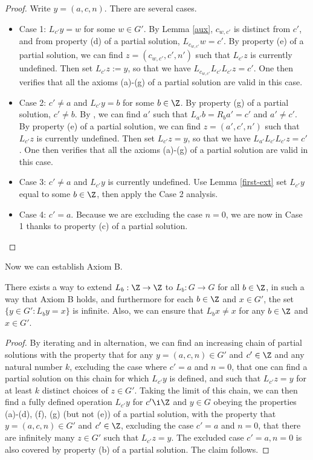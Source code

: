 \begin{proof} Write $y = (a,c,n)$. There are several cases.
  \begin{itemize}
    \item Case 1: $L_{c'} y = w$ for some $w \in G'$.  By Lemma \ref{aux}, $c_{w,c'}$ is distinct from $c'$, and from property (d) of a partial solution, $L_{c_{w,c'}} w = c'$.  By property (e) of a partial solution, we can find $z = (c_{w,c'}, c', n')$ such that $L_{c'} z$ is currently undefined.  Then set $L_{c'} z := y$, so that we have $L_{c_{w,c'}} L_{c'} L_{c'} z = c'$.  One then verifies that all the axioms (a)-(g) of a partial solution are valid in this case.
    \item Case 2: $c' \neq a$ and $L_{c'} y = b$ for some $b \in \Z$. By property (g) of a partial solution, $c' \neq b$.  By , we can find $a'$ such that $L_{a'} b = R_b a' = c'$ and $a' \neq c'$.  By property (e) of a partial solution, we can find $z = (a', c', n')$ such that $L_{c'} z$ is currently undefined.  Then set $L_{c'} z = y$, so that we have $L_{a'} L_{c'} L_{c'} z = c'$. One then verifies that all the axioms (a)-(g) of a partial solution are valid in this case.
    \item Case 3: $c' \neq a$ and $L_{c'} y$ is currently undefined.  Use Lemma \ref{first-ext} set $L_{c'} y$ equal to some $b \in \Z$, then apply the Case 2 analysis.
    \item Case 4: $c' = a$.  Because we are excluding the case $n=0$, we are now in Case 1 thanks to property (c) of a partial solution.
  \end{itemize}
\end{proof}


Now we can establish Axiom B.

\begin{proposition}\label{axiom-b}  There exists a way to extend $L_b: \Z \to \Z$ to $L_b: G \to G$ for all $b \in \Z$, in such a way that Axiom B holds, and furthermore for each $b \in \Z$ and $x \in G'$, the set $\{ y \in G': L_b y = x \}$ is infinite. Also, we can ensure that $L_b x \neq x$ for any $b \in \Z$ and $x \in G'$.
\end{proposition}

\begin{proof}
By iterating  and  in alternation, we can find an increasing chain of partial solutions with the property that for any $y = (a,c,n) \in G'$ and $c' \in \Z$ and any natural number $k$, excluding the case where $c'=a$ and $n=0$, that one can find a partial solution on this chain for which $L_{c'} y$ is defined, and such that $L_{c'} z = y$ for at least $k$ distinct choices of $z \in G'$.  Taking the limit of this chain, we can then find a fully defined operation $L_{c'} y$ for $c' \i \Z$ and $y \in G$ obeying the properties (a)-(d), (f), (g) (but not (e)) of a partial solution, with the property that
$y = (a,c,n) \in G'$ and $c' \in \Z$, excluding the case $c'=a$ and $n=0$, that there are infinitely many $z \in G'$ such that $L_{c'} z = y$.  The excluded case $c'=a, n=0$ is also covered by property (b) of a partial solution.  The claim follows.
\end{proof}


